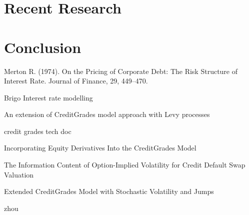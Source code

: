 \documentclass[11t,a4paper]{article}
\begin{document}
\section{Recent Research}
\section{Conclusion}
\newpage
\begin{thebibliography}{1}
Merton R. (1974).  On the Pricing of Corporate Debt: The Risk Structure of Interest Rate. Journal of Finance, 29, 449–470.

Brigo Interest rate modelling

An extension of CreditGrades model approach with Levy processes

credit grades tech doc

Incorporating Equity Derivatives Into the CreditGrades Model

The Information Content of Option-Implied Volatility for Credit Default Swap Valuation

Extended CreditGrades Model with Stochastic Volatility and Jumps

zhou 

\end{thebibliography}
\end{document}
